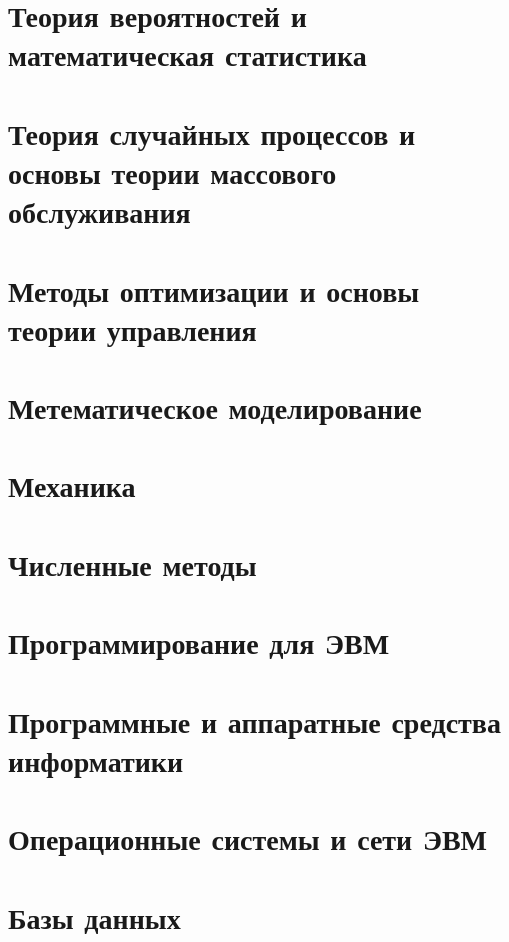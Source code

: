 \documentclass[12pt]{report}
\theoremstyle{plain}
\begin{document}
\chapter{Теория вероятностей и математическая статистика}

\chapter{Теория случайных процессов и основы теории массового обслуживания}

\chapter{Методы оптимизации и основы теории управления}

\chapter{Метематическое моделирование}

\chapter{Механика}

\chapter{Численные методы}

\chapter{Программирование для ЭВМ}

\chapter{Программные и аппаратные средства информатики}

\chapter{Операционные системы и сети ЭВМ}

\chapter{Базы данных}
\end{document}
